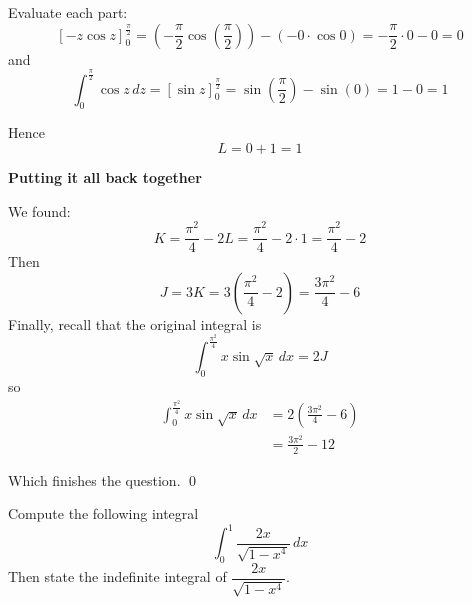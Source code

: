 \begin{solution}
    Evaluate each part:
    \[
        \left[ -z \cos z \right]_0^{\frac{\pi}{2}}
        = \left(-\frac{\pi}{2} \cos\left(\frac{\pi}{2}\right)\right) - \left(-0 \cdot \cos 0\right)
        = -\frac{\pi}{2} \cdot 0 - 0
        = 0
    \]
    and
    \[
        \int_0^{\frac{\pi}{2}} \cos z \, dz = [\sin z]_0^{\frac{\pi}{2}} = \sin\left(\frac{\pi}{2}\right) - \sin(0) = 1 - 0 = 1
    \]

    Hence
    \[
        L = 0 + 1 = 1
    \]

    \medskip
    \noindent\textbf{Putting it all back together}

    We found:
    \[
        K = \frac{\pi^2}{4} - 2L = \frac{\pi^2}{4} - 2 \cdot 1 = \frac{\pi^2}{4} - 2
    \]
    Then
    \[
        J = 3K = 3\left(\frac{\pi^2}{4} - 2\right) = \frac{3\pi^2}{4} - 6
    \]
    Finally, recall that the original integral is
    \[
        \int_0^{\frac{\pi^2}{4}} x \sin \sqrt{x} \, dx = 2J
    \]
    so
    \begin{align*}
        \int_0^{\frac{\pi^2}{4}} x \sin \sqrt{x} \, dx
            &= 2 \left( \frac{3\pi^2}{4} - 6 \right) \\
            &= \frac{3\pi^2}{2} - 12
    \end{align*}

    Which finishes the question.
    \qed
\end{solution}


\begin{example}
    Compute the following integral
    \[
        \int_{0}^{1} \frac{2x}{\sqrt{1 - x^4}} \, dx
    \]
    Then state the indefinite integral of $\dfrac{2x}{\sqrt{1 - x^4}}$.
\end{example}

